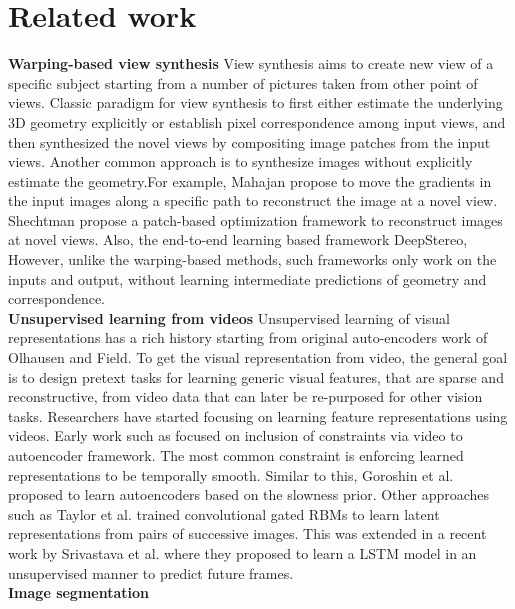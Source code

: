 \documentclass[10pt,twocolumn,letterpaper]{article}
\begin{document}
\section{Related work}
\textbf{Warping-based view synthesis}
View synthesis aims to create new view of a specific subject starting from a number of pictures taken from other point of views. Classic paradigm for view synthesis to first either estimate the underlying 3D geometry explicitly or establish pixel correspondence among input views, and then synthesized the novel views by compositing image patches from the input views\cite{malik1996modeling}\cite{fitzgibbon2005image}\cite{DBLP:journals/tog/ZitnickKUWS04}. Another common approach is to synthesize images without explicitly estimate the geometry.For example, Mahajan\cite{shechtman2010regenerative} propose to move the gradients in the input images along a specific path to reconstruct the image at a novel view. Shechtman\cite{shechtman2010regenerative} propose a patch-based optimization framework to reconstruct images at novel views. Also, the end-to-end learning based framework DeepStereo\cite{DBLP:journals/corr/FlynnNPS15}, However, unlike the warping-based methods, such frameworks only work on the inputs and output, without learning intermediate predictions of geometry and correspondence. 
\\
\textbf{Unsupervised learning from videos} Unsupervised learning of visual representations has a
rich history starting from original auto-encoders work of Olhausen and Field\cite{olshausen1997sparse}. To get the visual representation from video, the general goal is to design pretext tasks for learning generic visual features, that are sparse and reconstructive, from video data that can later be re-purposed for other vision tasks. Researchers have started focusing on learning feature representations using videos. Early work such as\cite{zou2012deep} focused on inclusion of constraints via video to autoencoder framework. The most common constraint is enforcing learned representations to be temporally smooth. Similar to this, Goroshin et al.\cite{goroshin2015unsupervised} proposed to learn autoencoders based on the slowness prior. Other approaches such as Taylor et al.\cite{taylor2010convolutional} trained convolutional gated RBMs to learn latent representations from pairs of successive images. This was extended in a recent work by Srivastava et al.\cite{srivastava2015unsupervised} where they proposed to learn a LSTM model in an unsupervised manner to predict future frames.
\\
\textbf{Image segmentation}
\end{document}
